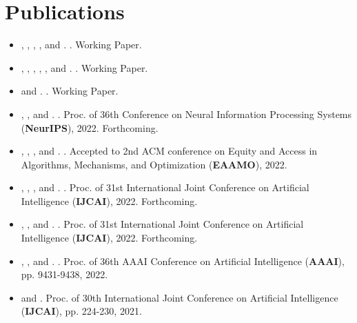 \documentclass{article}
\newcommand{\link}[2]{\iftoggle{uselinks}{\href{#1}{#2}}{#2}\xspace}
\newcommand{\itlink}[2]{\link{https://daniel-halpern.com/files/#1.pdf}{\textit{#2}}}
\newcommand{\me}{\link{https://daniel-halpern.com}{D. Halpern}}
\newcommand{\nisarg}{\link{https://www.cs.toronto.edu/~nisarg}{N. Shah}}
\newcommand{\ariel}{\link{http://procaccia.info}{A. D. Procaccia}}
\newcommand{\alex}{\link{https://www.alexpsomas.com}{A. Psomas}}
\newcommand{\greg}{\link{https://gregorykehne.com}{G. Kehne}}
\newcommand{\manon}{\link{https://manrev.github.io/manon/}{M. Revel}}
\newcommand{\tao}{\link{https://tao-l.github.io}{T. Lin}}
\newcommand{\jamie}{\link{http://www.jamie.tuckerfoltz.com}{J. Tucker-Foltz}}
\newcommand{\dad}{\link{https://www.cs.cornell.edu/home/halpern/}{J. Y. Halpern}}
\newcommand{\ali}{\link{https://jadbabaie.mit.edu}{A. Jadbabaie}}
\newcommand{\elchanan}{\link{https://math.mit.edu/~elmos/}{E. Mossel}}
\newcommand{\allan}{\link{https://www.cs.toronto.edu/~bor/}{A. Borodin}}
\newcommand{\mohamad}{\link{https://www.cs.toronto.edu/~latifian/}{M. Latifian}}
\newcommand{\adam}{\link{https://polisci.mit.edu/people/adam-berinsky}{A. Berinsky}}
\newcommand{\gerdus}{\link{http://www.gerdusbenade.com}{G. Benadè}}
\newcommand{\manuel}{\link{https://ei.is.mpg.de/~mwuthrich}{Manuel W\"uthrich}}
\begin{document}
    \section{Publications}
    \begin{itemize}
        \setlength\itemsep{.8ex}
        \item \me, \greg, \ariel, \jamie, and \manuel. \itlink{representation-incomplete}{Representation with Incomplete Votes}. Working Paper.
        \item \me, \dad, \ali, \elchanan, \ariel, and \manon. \itlink{liquid-defense}{In Defense of Liquid Democracy}. Working Paper.

        \item \me and \ariel. \itlink{unbiased-information}{Unbiased Information Packets}. Working Paper.

        \item \gerdus, \me, and \alex. \itlink{dynamic-fair-division}{Dynamic Fair Division with Partial Information}. Proc. of 36th Conference on Neural Information Processing Systems (\textbf{NeurIPS}), 2022. Forthcoming.
        
        \item \manon, \me, \adam, and \ali. \itlink{liquid-in-practice}{Liquid Democracy in Practice: An Empirical Analysis of its Epistemic Performance}. Accepted to 2nd ACM conference on Equity and Access in Algorithms, Mechanisms, and Optimization (\textbf{EAAMO}), 2022.

        \item \allan, \me, \mohamad, and \nisarg. \itlink{distortion-top-t}{Distortion in Voting with Top-t Preferences}. Proc. of 31st International Joint Conference on Artificial Intelligence (\textbf{IJCAI}), 2022. Forthcoming.
        
        \item \me, \greg, and \jamie. \itlink{buyers-reveal}{Can Buyers Reveal for a Better Deal?}. Proc. of 31st International Joint Conference on Artificial Intelligence (\textbf{IJCAI}), 2022. Forthcoming.
        
        \item \manon, \tao, and \me. \itlink{optimal-congress}{How Many Representatives Do We Need? The Optimal Size of an Epistemic Congress}.
        Proc. of 36th AAAI Conference on Artificial Intelligence (\textbf{AAAI}), pp. 9431-9438, 2022. 
        
        \item \me and \nisarg \itlink{distortion-fair-division}{Fair and Efficient Resource Allocation with Partial Information}.
        Proc. of 30th International Joint Conference on Artificial Intelligence (\textbf{IJCAI}), pp. 224-230, 2021. 
        

\end{itemize}
\end{document}

